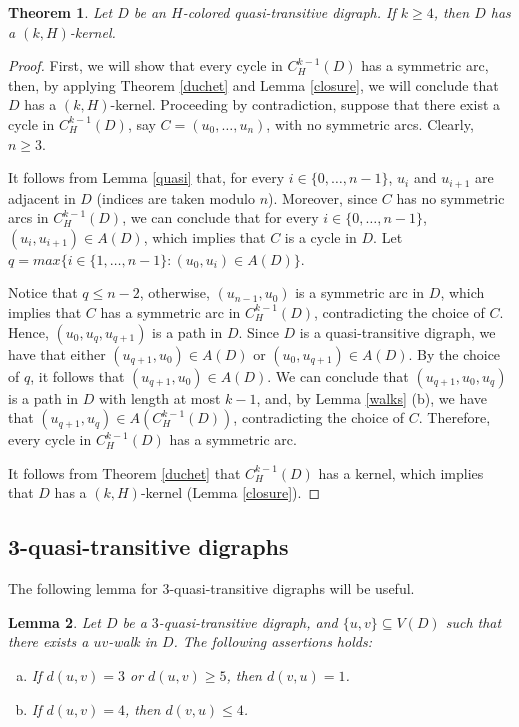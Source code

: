 \documentclass[10pt,a4paper]{article}
\newtheorem{theorem}{Theorem}[section]
\newtheorem{lemma}[theorem]{Lemma}
\begin{document}
\begin{theorem}
\label{panqker}
Let $D$ be an $H$-colored quasi-transitive digraph. If $k \geq 4$, then $D$ has a $(k,H)$-kernel.
\end{theorem}
\begin{proof}
First, we will show that every cycle in $C_{H}^{k-1}(D)$ has a symmetric arc, then, by applying Theorem \ref{duchet} and Lemma \ref{closure}, we will conclude that $D$ has a $(k,H)$-kernel. Proceeding by contradiction, suppose that there exist a cycle in  $C_{H}^{k-1}(D)$, say $C=(u_{0}, \ldots , u_{n})$, with no symmetric arcs. Clearly, $n \geq 3$.

It follows from Lemma \ref{quasi} that, for every $i \in  \{ 0, \ldots , n-1\}$, $u_{i}$ and $u_{i+1}$ are adjacent in $D$ (indices are taken modulo $n$). Moreover, since $C$ has no symmetric arcs in $C_{H}^{k-1}(D)$, we can conclude that  for every $i \in  \{ 0, \ldots , n-1\}$, $(u_{i}, u_{i+1}) \in A(D)$, which implies that $C$ is a cycle in $D$. Let $q = max \{ i \in \{1, \ldots , n-1 \} : (u_{0}, u_{i}) \in A(D) \}$. 

Notice that $q \leq n-2$, otherwise, $(u_{n-1},u_{0})$ is a symmetric arc in $D$, which implies that $C$ has a symmetric arc in $C_{H}^{k-1}(D)$, contradicting the choice of $C$. Hence, $(u_{0}, u_{q}, u_{q+1})$ is a path in $D$.
 Since $D$ is a quasi-transitive digraph, we have that either $(u_{q+1}, u_{0}) \in A(D)$ or $(u_{0}, u_{q+1}) \in A(D)$. By the choice of $q$, it follows that $(u_{q+1}, u_{0})  \in A(D)$.
  We can conclude that $(u_{q+1}, u_{0}, u_{q})$ is a path in $D$ with length at most $k-1$, and, by Lemma \ref{walks} (b), we have that $(u_{q+1}, u_{q}) \in A(C_{H}^{k-1}(D))$, contradicting the choice of $C$. Therefore, every cycle in $C_{H}^{k-1}(D)$ has a symmetric arc.

It follows from Theorem \ref{duchet} that $C_{H}^{k-1}(D)$ has a kernel, which implies that $D$ has a $(k,H)$-kernel (Lemma \ref{closure}).
\end{proof}


\subsection{3-quasi-transitive digraphs}

The following lemma for $3$-quasi-transitive digraphs will be useful.

\begin{lemma}\cite{3qt}
\label{distance3quasitrans}
Let $D$ be a $3$-quasi-transitive digraph, and $\{u,v \} \subseteq V(D)$ such that there exists a $uv$-walk in $D$. The following assertions holds:
	\begin{enumerate}[a)]
	\item If $d(u,v) = 3$ or $d(u,v) \geq 5$, then $d(v,u)=1$.
	
	\item If $d(u,v)=4$, then $d(v,u) \leq 4$.
	\end{enumerate}
\end{lemma}
\end{document}
